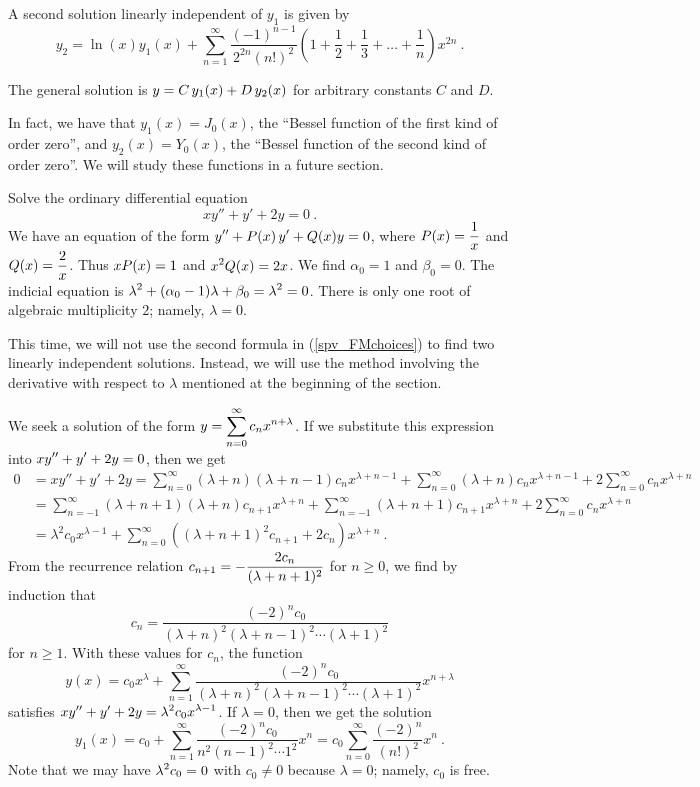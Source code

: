 \begin{egg}
A second solution linearly independent of $y_1$ is given by
\[
y_2 = \ln(x) y_1(x) + \sum_{n=1}^\infty 
\frac{(-1)^{n-1}}{2^{2n}(n!)^2}\left(1+\frac{1}{2}
  +\frac{1}{3} + \ldots + \frac{1}{n}\right) x^{2n}  \ .
\]

The general solution is
$\displaystyle y = C\, y_1(x) + D\, y_2(x)$ for arbitrary constants
$C$ and $D$.

In fact, we have that $y_1(x) = J_0(x)$, the ``Bessel function of
the first kind of order zero'', and $y_2(x) = Y_0(x)$, the ``Bessel
function of the second kind of order zero''.  We will study these
functions in a future section.
\end{egg}

\begin{egg}
Solve the ordinary differential equation
\[
xy''+  y' + 2 y = 0 \ .
\]
We have an equation of the form
$\displaystyle y'' + P(x)\, y' + Q(x) y = 0$, where
$\displaystyle P(x) = \frac{1}{x}$ and
$\displaystyle Q(x) = \frac{2}{x}$.
Thus $\displaystyle x P(x) = 1$ and
$\displaystyle x^2 Q(x) = 2x$.  We find
$\alpha_0 = 1$ and $\beta_0= 0$.  The indicial equation is
$\displaystyle \lambda^2 + (\alpha_0 - 1)\lambda + \beta_0 = \lambda^2 = 0$.
There is only one root of algebraic multiplicity $2$; namely, $\lambda=0$.

This time, we will not use the second formula in (\ref{spv_FMchoices})
to find two linearly independent solutions.  Instead, we will use the
method involving the derivative with respect to $\lambda$ mentioned at
the beginning of the section.

We seek a solution of the form
$\displaystyle y = \sum_{n=0}^\infty c_n x^{n+\lambda}$.
If we substitute this expression into
$\displaystyle xy''+ y' + 2y = 0$, then we get
\begin{align*}
0 & = xy''+ y' + 2y
= \sum_{n=0}^\infty (\lambda +n)(\lambda + n-1) c_n x^{\lambda + n-1}
+ \sum_{n=0}^\infty (\lambda +n) c_n x^{\lambda + n-1}
+ 2\sum_{n=0}^\infty c_n x^{\lambda + n} \\
&= \sum_{n=-1}^\infty (\lambda +n+1)(\lambda +n) c_{n+1} x^{\lambda +n}
+ \sum_{n=-1}^\infty (\lambda +n+1)c_{n+1} x^{\lambda +n}
+ 2\sum_{n=0}^\infty c_n x^{\lambda +n} \\
&= \lambda^2 c_0 x^{\lambda -1}
+ \sum_{n=0}^\infty \left( (\lambda +n+1)^2 c_{n+1} +
2c_n\right) x^{\lambda +n} \ .
\end{align*}
From the recurrence relation
$\displaystyle c_{n+1} = - \frac{2c_n}{(\lambda +n+1)^2}$
for $n \geq 0$, we find by induction that
\[
c_n = \frac{(-2)^n c_0}
{(\lambda +n)^2(\lambda +n-1)^2\cdots (\lambda + 1)^2}
\]
for $n \geq 1$. With these values for $c_n$, the function
\[
y(x) = c_0 x^\lambda + \sum_{n=1}^\infty 
\frac{(-2)^n c_0} {(\lambda +n)^2(\lambda +n-1)^2\cdots (\lambda + 1)^2}
x^{n+\lambda}
\]
satisfies $\displaystyle xy''+ y' + 2y = \lambda^2 c_0 x^{\lambda -1}$.
If $\lambda = 0$, then we get the solution
\[
y_1(x) = c_0 + \sum_{n=1}^\infty
\frac{(-2)^n c_0} {n^2 (n-1)^2 \cdots 1^2}x^n
= c_0 \sum_{n=0}^\infty \frac{(-2)^n} {(n!)^2} x^n \  .
\]
Note that we may have $\displaystyle \lambda^2 c_0 = 0$ with $c_0 \neq 0$
because $\lambda =0$; namely, $c_0$ is free.


\end{egg}

